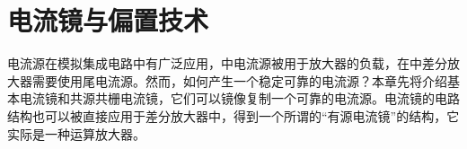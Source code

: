 \chapter{电流镜与偏置技术}
电流源在模拟集成电路中有广泛应用，中电流源被用于放大器的负载，在中差分放大器需要使用尾电流源。然而，如何产生一个稳定可靠的电流源？本章先将介绍基本电流镜和共源共栅电流镜，它们可以镜像复制一个可靠的电流源。电流镜的电路结构也可以被直接应用于差分放大器中，得到一个所谓的“有源电流镜”的结构，它实际是一种运算放大器。



